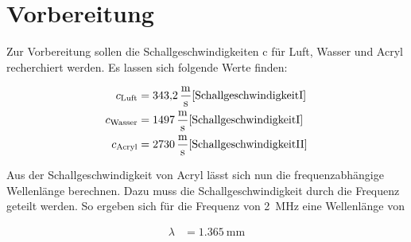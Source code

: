 \section{Vorbereitung}
Zur Vorbereitung sollen die Schallgeschwindigkeiten c für Luft, Wasser und Acryl recherchiert werden. Es 
lassen sich folgende Werte finden:

\begin{align*}
    c_\text{Luft}   &= \qty{343,2}{\meter \per \second}    \text{\cite{SchallgeschwindigkeitI}}     \\
    c_\text{Wasser} &= \qty{1497}{\meter \per \second}     \text{\cite{SchallgeschwindigkeitI}}    \\
    c_\text{Acryl}  &= \qty{2730}{\meter \per \second}     \text{\cite{SchallgeschwindigkeitII}}    \\
\end{align*}

\noindent Aus der Schallgeschwindigkeit von Acryl lässt sich nun die frequenzabhängige Wellenlänge berechnen. 
Dazu muss die Schallgeschwindigkeit durch die Frequenz geteilt werden. So ergeben sich für die Frequenz von \qty{2}{\mega\hertz} 
eine Wellenlänge von

\begin{align*}
     \lambda &= \qty{1,365}{\milli \meter}   \\
\end{align*}

%